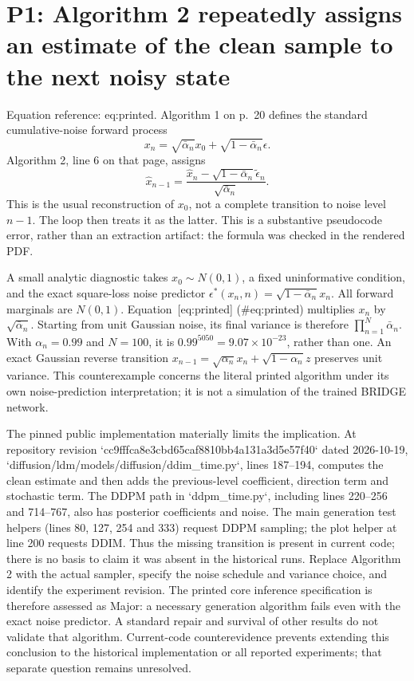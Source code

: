 \documentclass[10pt]{article}
\begin{document}
\section*{P1: Algorithm 2 repeatedly assigns an estimate of the clean sample to the next noisy state}
Equation reference: eq:printed. Algorithm 1 on p. 20 defines the standard cumulative-noise forward process \[x_n=\sqrt{\bar\alpha_n}x_0+\sqrt{1-\bar\alpha_n}\epsilon.\] Algorithm 2, line 6 on that page, assigns \[
 \widehat x_{n-1}=\frac{\widehat x_n-\sqrt{1-\bar\alpha_n}\widetilde\epsilon_n}{\sqrt{\bar\alpha_n}}.\] This is the usual reconstruction of \(x_0\), not a complete transition to noise level \(n-1\). The loop then treats it as the latter. This is a substantive pseudocode error, rather than an extraction artifact: the formula was checked in the rendered PDF.\par
A small analytic diagnostic takes \(x_0\sim N(0,1)\), a fixed uninformative condition, and the exact square-loss noise predictor \(\epsilon^*(x_n,n)=\sqrt{1-\bar\alpha_n}x_n\). All forward marginals are \(N(0,1)\). Equation [eq:printed] (\#eq:printed) multiplies \(x_n\) by \(\sqrt{\bar\alpha_n}\). Starting from unit Gaussian noise, its final variance is therefore \(\prod_{n=1}^N\bar\alpha_n\). With \(\alpha_n=0.99\) and \(N=100\), it is \(0.99^{5050}=9.07\times10^{-23}\), rather than one. An exact Gaussian reverse transition \(x_{n-1}=\sqrt{\alpha_n}x_n+\sqrt{1-\alpha_n}z\) preserves unit variance. This counterexample concerns the literal printed algorithm under its own noise-prediction interpretation; it is not a simulation of the trained BRIDGE network.\par
The pinned public implementation materially limits the implication. At repository revision `cc9fffca8e3cbd65caf8810bb4a131a3d5e57f40` dated 2026-10-19, `diffusion/ldm/models/diffusion/ddim\_time.py`, lines 187–194, computes the clean estimate and then adds the previous-level coefficient, direction term and stochastic term. The DDPM path in `ddpm\_time.py`, including lines 220–256 and 714–767, also has posterior coefficients and noise. The main generation test helpers (lines 80, 127, 254 and 333) request DDPM sampling; the plot helper at line 200 requests DDIM. Thus the missing transition is present in current code; there is no basis to claim it was absent in the historical runs. Replace Algorithm 2 with the actual sampler, specify the noise schedule and variance choice, and identify the experiment revision. The printed core inference specification is therefore assessed as Major: a necessary generation algorithm fails even with the exact noise predictor. A standard repair and survival of other results do not validate that algorithm. Current-code counterevidence prevents extending this conclusion to the historical implementation or all reported experiments; that separate question remains unresolved.\par
\end{document}
